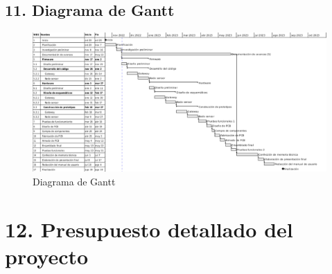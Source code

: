 \documentclass[
11pt, %
]{charter}
\begin{document}
\begin{landscape}
\section{11. Diagrama de Gantt}
\label{sec:gantt}

\begin{figure}[htpb]
\centering 
\includegraphics[height=.72\textheight]{./Figuras/Gantt.png}
\caption{Diagrama de Gantt}
\label{fig:diagGantt}
\end{figure}

\end{landscape}


\section{12. Presupuesto detallado del proyecto}
\label{sec:presupuesto}
\end{document}
